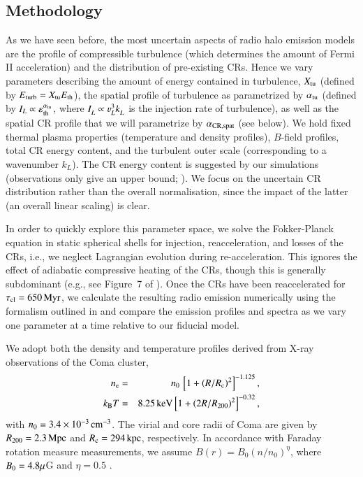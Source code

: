 \documentclass[fleqn,usenatbib,useAMS]{mnras}
\newcommand{\eps}{\varepsilon}
\begin{document}
\subsection{Methodology}

As we have seen before, the most uncertain aspects of radio halo
emission models are the profile of compressible turbulence (which
determines the amount of Fermi II acceleration) and the distribution
of pre-existing CRs. Hence we vary parameters describing the amount of
energy contained in turbulence, $X_{\rm tu}$ (defined by $E_{\rm
  turb} = X_{\rm tu} E_{\rm th}$), the spatial profile of
turbulence as parametrized by $\alpha_{\rm tu}$ (defined by $I_L
\propto \eps_{\rm th}^{\alpha_{\rm tu}}$, where $I_L^{} \propto
\varv_L^{3} k_L^{}$ is the injection rate of turbulence), as well as
the spatial CR profile that we will parametrize by $\alpha_{\rm CR,
  spat}$ (see below).  We hold fixed thermal plasma properties
(temperature and density profiles), $B$-field profiles, total CR energy
content, and the turbulent outer scale (corresponding to a wavenumber
$k_L$). The CR energy content is suggested by our simulations
(observations only give an upper bound;
\citealt{2012ApJ...757..123A}). We focus on the uncertain CR
distribution rather than the overall normalisation, since the impact
of the latter (an overall linear scaling) is clear.

In order to quickly explore this parameter space, we solve the
Fokker-Planck equation in static spherical shells for injection,
reacceleration, and losses of the CRs, i.e., we neglect Lagrangian
evolution during re-acceleration.  This ignores the effect of
adiabatic compressive heating of the CRs, though this is generally
subdominant (e.g., see Figure~7 of \citealt{miniati15}). Once
the CRs have been reaccelerated for $\tau_{\mathrm{cl}} = 650\,{\mathrm{Myr}}$,
we calculate the resulting radio emission numerically using the
formalism outlined in \cite{1979rpa..book.....R} and compare the
emission profiles and spectra as we vary one parameter at a time
relative to our fiducial model.

We adopt both the density \citep{1992A&A...259L..31B} and temperature
profiles \citep{2009ApJ...696.1886B,2001A&A...365L..67A} derived from
X-ray observations of the Coma cluster,
\begin{eqnarray}
n_{{\mathrm{e}}} &=& n_0\,\left[1+\left(R/R_{{\mathrm{c}}}\right)^2\right]^{-1.125},\nonumber\\
k_{{\mathrm{B}}} T &=& 8.25\,{\mathrm{keV}} \left[1+\left(2R/R_{200}\right)^2\right]^{-0.32},
\end{eqnarray}
with $n_0=3.4\times10^{-3}\,{\mathrm{cm}}^{-3}$.  The virial and core radii
of Coma are given by $R_{200} = 2.3\,{\mathrm{Mpc}}$
\citep{2002ApJ...567..716R} and $R_{{\mathrm{c}}} = 294\,{\mathrm{kpc}}$,
respectively. In accordance with Faraday rotation measure
measurements, we assume $B(r)=B_{0} (n/n_{0})^{\eta}$, where
$B_{0}=4.8 \mu$G and $\eta=0.5$ \citep{bonafede10}.
\end{document}
